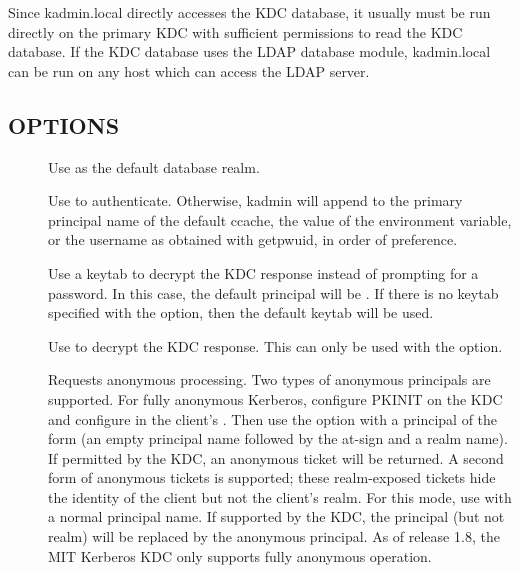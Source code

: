 \documentclass[letterpaper,10pt,english]{sphinxmanual}
\begin{document}
Since kadmin.local directly accesses the KDC database, it usually must
be run directly on the primary KDC with sufficient permissions to read
the KDC database.  If the KDC database uses the LDAP database module,
kadmin.local can be run on any host which can access the LDAP server.


\subsection{OPTIONS}
\label{\detokenize{admin/admin_commands/kadmin_local:options}}\label{\detokenize{admin/admin_commands/kadmin_local:kadmin-options}}\begin{description}
\item[{ }] \leavevmode
Use  as the default database realm.

\item[{ }] \leavevmode
Use  to authenticate.  Otherwise, kadmin will append
 to the primary principal name of the default ccache,
the value of the  environment variable, or the username as
obtained with getpwuid, in order of preference.

\item[{}] \leavevmode
Use a keytab to decrypt the KDC response instead of prompting for
a password.  In this case, the default principal will be
.  If there is no keytab specified with the
 option, then the default keytab will be used.

\item[{ }] \leavevmode
Use  to decrypt the KDC response.  This can only be used
with the  option.

\item[{}] \leavevmode
Requests anonymous processing.  Two types of anonymous principals
are supported.  For fully anonymous Kerberos, configure PKINIT on
the KDC and configure  in the client’s
{\hyperref[\detokenize{admin/conf_files/krb5_conf:krb5-conf-5}]{}}.  Then use the  option with a principal
of the form  (an empty principal name followed by the
at-sign and a realm name).  If permitted by the KDC, an anonymous
ticket will be returned.  A second form of anonymous tickets is
supported; these realm-exposed tickets hide the identity of the
client but not the client’s realm.  For this mode, use  with a normal principal name.  If supported by the KDC, the
principal (but not realm) will be replaced by the anonymous
principal.  As of release 1.8, the MIT Kerberos KDC only supports
fully anonymous operation.


\end{description}
\end{document}
